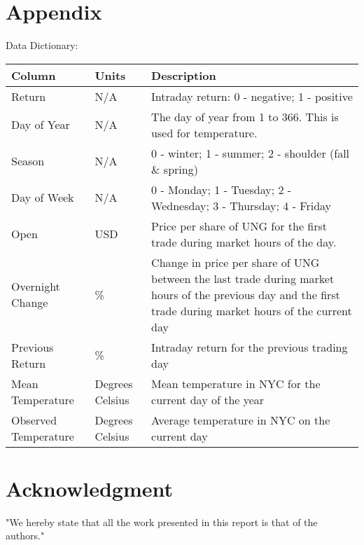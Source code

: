 \documentclass[conference,letterpaper]{IEEEtran}
\begin{document}
\section{Appendix}
Data Dictionary:
\begin{center}
    \begin{tabular}{ | p{2cm} | p{1.5cm} | p{3cm} |}
    \hline
    Column & Units & Description \\ \hline
    Return & N/A & Intraday return: 0 - negative; 1 - positive \\ \hline
    Day of Year & N/A & The day of year from 1 to 366. This is used for temperature. \\ \hline
    Season & N/A & 0 - winter; 1 - summer; 2 - shoulder (fall \& spring) \\ \hline
    Day of Week & N/A & 0 - Monday; 1 - Tuesday; 2 - Wednesday; 3 - Thursday; 4 - Friday \\ \hline
    Open & USD & Price per share of UNG for the first trade during market hours of the day. \\ \hline
    Overnight Change & \% & Change in price per share of UNG between the last trade during market
    hours of the previous day and the first trade during market hours of the current day \\ \hline
    Previous Return & \% & Intraday return for the previous trading day \\ \hline
    Mean Temperature & Degrees Celsius & Mean temperature in NYC for the current day of the year \\ \hline
    Observed Temperature & Degrees Celsius & Average temperature in NYC on the current day \\ \hline
    \end{tabular}
\end{center}

\section*{Acknowledgment}
"We hereby state that all the work presented in 
this report is that of the authors."

\end{document}
